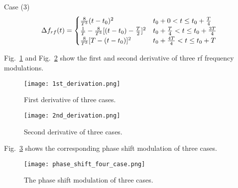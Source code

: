 Case (3) 
\begin{eqnarray}\Delta f_{rf}(t)= 
\begin{cases}
\frac{8}{T^3}(t-t_0)^2&t_0+0<t\le t_0+\frac{T}{4}\cr  
\frac{1}{T}-\frac{8}{T^3}[(t-t_0)-\frac{T}{2}]^2	&t_0+\frac{T}{4}<t\le t_0+\frac{3T}{4}\cr 
\frac{8}{T^3}[T-(t-t_0)]^2	&t_0+\frac{4T}{4}<t\le t_0+T\cr  

\end{cases}
\end{eqnarray}


Fig.~\ref{1st_derivation} and Fig.~\ref{2nd_derivation} show the first and second derivative of three rf frequency modulations.
\begin{figure}[H]
   \centering   
   \texttt{[image: 1st\_derivation.png]}
   \caption{First derivative of three cases.}
   \label{1st_derivation}
\end{figure}
\begin{figure}[H]
   \centering   
   \texttt{[image: 2nd\_derivation.png]}
   \caption{Second derivative of three cases.}
   \label{2nd_derivation}
\end{figure}

Fig.~\ref{phase_shift_four_case} shows the corresponding phase shift modulation of three cases. 
\begin{figure}[H]
   \centering   
   \texttt{[image: phase\_shift\_four\_case.png]}
   \caption{The phase shift modulation of three cases.}
   \label{phase_shift_four_case}
\end{figure}

